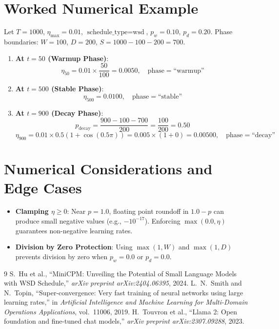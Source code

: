 \documentclass[11pt,a4paper]{article}
\theoremstyle{definition}
\begin{document}
\section{Worked Numerical Example}

Let $T = 1000$, $\eta_{\max} = 0.01$, $\text{schedule\_type} = \text{wsd}$, $p_w = 0.10$, $p_d = 0.20$.
Phase boundaries: $W = 100$, $D = 200$, $S = 1000 - 100 - 200 = 700$.

\begin{enumerate}
    \item \textbf{At $t = 50$ (Warmup Phase)}:
    \begin{equation}
    \eta_{50} = 0.01 \times \frac{50}{100} = 0.0050, \quad \text{phase} = \text{``warmup''}
    \end{equation}
    \item \textbf{At $t = 500$ (Stable Phase)}:
    \begin{equation}
    \eta_{500} = 0.0100, \quad \text{phase} = \text{``stable''}
    \end{equation}
    \item \textbf{At $t = 900$ (Decay Phase)}:
    \begin{equation}
    p_{\text{decay}} = \frac{900 - 100 - 700}{200} = \frac{100}{200} = 0.50
    \end{equation}
    \begin{equation}
    \eta_{900} = 0.01 \times 0.5(1 + \cos(0.5 \pi)) = 0.005 \times (1 + 0) = 0.00500, \quad \text{phase} = \text{``decay''}
    \end{equation}
\end{enumerate}

\section{Numerical Considerations and Edge Cases}

\begin{itemize}
    \item \textbf{Clamping $\eta \ge 0$}: Near $p=1.0$, floating point roundoff in $1.0 - p$ can produce small negative values (e.g., $-10^{-17}$). Enforcing $\max(0.0, \eta)$ guarantees non-negative learning rates.
    \item \textbf{Division by Zero Protection}: Using $\max(1, W)$ and $\max(1, D)$ prevents division by zero when $p_w = 0.0$ or $p_d = 0.0$.
\end{itemize}

\begin{thebibliography}{9}
 S.~Hu et al., ``MiniCPM: Unveiling the Potential of Small Language Models with WSD Schedule,'' \emph{arXiv preprint arXiv:2404.06395}, 2024.
 L.~N.~Smith and N.~Topin, ``Super-convergence: Very fast training of neural networks using large learning rates,'' in \emph{Artificial Intelligence and Machine Learning for Multi-Domain Operations Applications}, vol.~11006, 2019.
 H.~Touvron et al., ``Llama 2: Open foundation and fine-tuned chat models,'' \emph{arXiv preprint arXiv:2307.09288}, 2023.
\end{thebibliography}
\end{document}
